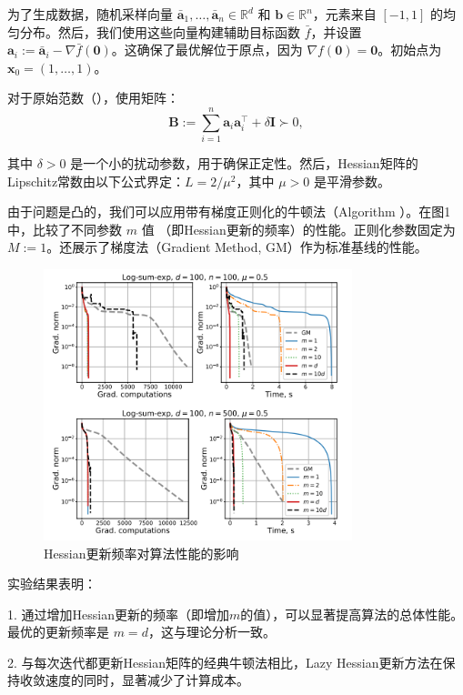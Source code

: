 \documentclass[a4paper,twoside,AutoFakeBold]{article}
\theoremstyle{definition}
\begin{document}
为了生成数据，随机采样向量 \(\bar{\mathbf{a}}_{1}, \ldots, \bar{\mathbf{a}}_{n} \in \mathbb{R}^{d}\) 和 \(\mathbf{b} \in \mathbb{R}^{n}\)，元素来自 \([-1, 1]\) 的均匀分布。然后，我们使用这些向量构建辅助目标函数 \(\bar{f}\)，并设置 \(\mathbf{a}_{i} := \bar{\mathbf{a}}_{i} - \nabla \bar{f}(\mathbf{0})\)。这确保了最优解位于原点，因为 \(\nabla f(\mathbf{0}) = \mathbf{0}\)。初始点为 \(\mathbf{x}_{0} = (1, \ldots, 1)\)。

对于原始范数（），使用矩阵：
\[
\mathbf{B} := \sum_{i=1}^{n} \mathbf{a}_{i} \mathbf{a}_{i}^{\top} + \delta \mathbf{I} \succ 0,
\]

其中 \(\delta > 0\) 是一个小的扰动参数，用于确保正定性。然后，Hessian矩阵的Lipschitz常数由以下公式界定：\(L = 2 / \mu^{2}\)，其中 \(\mu > 0\) 是平滑参数。

由于问题是凸的，我们可以应用带有梯度正则化的牛顿法（Algorithm ）。在图1中，比较了不同参数 \(m\) 值
（即Hessian更新的频率）的性能。正则化参数固定为 \(M := 1\)。还展示了梯度法（Gradient Method, GM）作为标准基线的性能。

\begin{figure}[H]
    \centering
    \includegraphics[width=0.8\textwidth]{figs/1.png}
    \caption{Hessian更新频率对算法性能的影响}
    \label{fig:fig1}
\end{figure}

实验结果表明：

1. 通过增加Hessian更新的频率（即增加$m$的值），可以显著提高算法的总体性能。最优的更新频率是 
$m=d$，这与理论分析一致。

2. 与每次迭代都更新Hessian矩阵的经典牛顿法相比，Lazy Hessian更新方法在保持收敛速度的同时，显著减少了计算成本。
\end{document}
